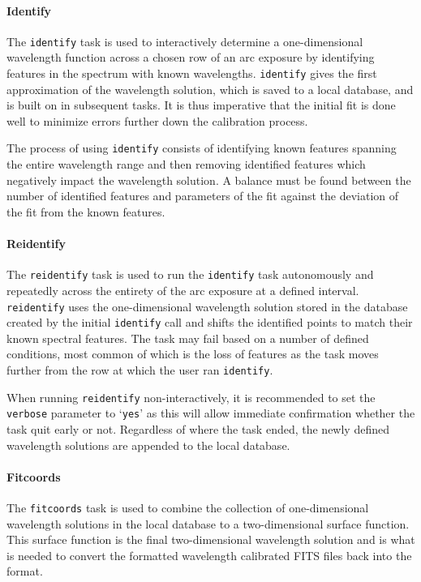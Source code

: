 \paragraph{Identify}
The \texttt{identify} task is used to interactively determine a one-dimensional wavelength function across a chosen row of an arc exposure by identifying features in the spectrum with known wavelengths. \texttt{identify} gives the first approximation of the wavelength solution, which is saved to a local database, and is built on in subsequent tasks. It is thus imperative that the initial fit is done well to minimize errors further down the calibration process.
\prgph

The process of using \texttt{identify} consists of identifying known features spanning the entire wavelength range and then removing identified features which negatively impact the wavelength solution. A balance must be found between the number of identified features and parameters of the fit against the deviation of the fit from the known features. %

\paragraph{Reidentify}
The \texttt{reidentify} task is used to run the \texttt{identify} task autonomously and repeatedly across the entirety of the arc exposure at a defined interval. \texttt{reidentify} uses the one-dimensional wavelength solution stored in the database created by the initial \texttt{identify} call and shifts the identified points to match their known spectral features. The task may fail based on a number of defined conditions, most common of which is the loss of features as the task moves further from the row at which the user ran \texttt{identify}.
\prgph

When running \texttt{reidentify} non-interactively, it is recommended to set the \texttt{verbose} parameter to `\texttt{yes}' as this will allow immediate confirmation whether the task quit early or not. Regardless of where the task ended, the newly defined wavelength solutions are appended to the local database.

\paragraph{Fitcoords}
The \texttt{fitcoords} task is used to combine the collection of one-dimensional wavelength solutions in the local database to a two-dimensional surface function. This surface function is the final two-dimensional wavelength solution and is what is needed to convert the \iraf formatted wavelength calibrated \gls{FITS} files back into the \polsalt format.
\prgph

